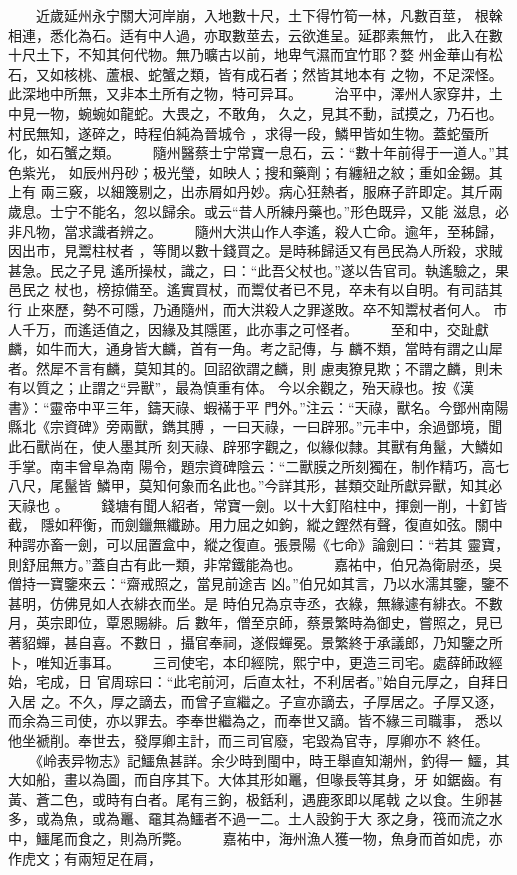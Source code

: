 \documentclass{ctexart}
\begin{document}
　　近歲延州永宁關大河岸崩，入地數十尺，土下得竹筍一林，凡數百莖， 根榦相連，悉化為石。适有中人過，亦取數莖去，云欲進呈。延郡素無竹， 此入在數十尺土下，不知其何代物。無乃曠古以前，地卑气濕而宜竹耶？婺 州金華山有松石，又如核桃、蘆根、蛇蟹之類，皆有成石者；然皆其地本有 之物，不足深怪。此深地中所無，又非本土所有之物，特可异耳。 　　治平中，澤州人家穿井，土中見一物，蜿蜿如龍蛇。大畏之，不敢角， 久之，見其不動，試摸之，乃石也。村民無知，遂碎之，時程伯純為晉城令 ，求得一段，鱗甲皆如生物。蓋蛇蜃所化，如石蟹之類。 　　隨州醫蔡士宁常寶一息石，云：``數十年前得于一道人。''其色紫光， 如辰州丹砂；极光瑩，如映人；搜和藥劑；有纏紐之紋；重如金錫。其上有 兩三竅，以細篾剔之，出赤屑如丹妙。病心狂熱者，服麻子許即定。其斤兩 歲息。士宁不能名，忽以歸余。或云``昔人所練丹藥也。''形色既异，又能 滋息，必非凡物，當求識者辨之。 　　隨州大洪山作人李遙，殺人亡命。逾年，至秭歸，因出市，見鬻柱杖者 ，等閒以數十錢買之。是時秭歸适又有邑民為人所殺，求賊甚急。民之子見 遙所操杖，識之，曰：``此吾父杖也。''遂以告官司。執遙驗之，果邑民之 杖也，榜掠備至。遙實買杖，而鬻仗者已不見，卒未有以自明。有司詰其行 止來歷，勢不可隱，乃通隨州，而大洪殺人之罪遂敗。卒不知鬻杖者何人。 市人千万，而遙适值之，因緣及其隱匿，此亦事之可怪者。 　　至和中，交趾獻麟，如牛而大，通身皆大麟，首有一角。考之記傳，与 麟不類，當時有謂之山犀者。然犀不言有麟，莫知其的。回詔欲謂之麟，則 慮夷獠見欺；不謂之麟，則未有以質之；止謂之``异獸''，最為慎重有体。 今以余觀之，殆天祿也。按《漢書》：``靈帝中平三年，鑄天祿、蝦襔于平 門外。''注云：``天祿，獸名。今鄧州南陽縣北《宗資碑》旁兩獸，鐫其膊 ，一曰天祿，一曰辟邪。''元丰中，余過鄧境，聞此石獸尚在，使人墨其所 刻天祿、辟邪字觀之，似緣似隸。其獸有角鬣，大鱗如手掌。南丰曾阜為南 陽令，題宗資碑陰云：``二獸膜之所刻獨在，制作精巧，高七八尺，尾鬣皆 鱗甲，莫知何象而名此也。''今詳其形，甚類交趾所獻异獸，知其必天祿也 。 　　錢塘有聞人紹者，常寶一劍。以十大釘陷柱中，揮劍一削，十釘皆截， 隱如秤衡，而劍鑞無纖跡。用力屈之如鉤，縱之鏗然有聲，復直如弦。關中 种諤亦畜一劍，可以屈置盒中，縱之復直。張景陽《七命》論劍曰：``若其 靈寶，則舒屈無方。''蓋自古有此一類，非常鐵能為也。 　　嘉祐中，伯兄為衛尉丞，吳僧持一寶鑒來云：``齋戒照之，當見前途吉 凶。''伯兄如其言，乃以水濡其鑒，鑒不甚明，仿佛見如人衣緋衣而坐。是 時伯兄為京寺丞，衣綠，無緣遽有緋衣。不數月，英宗即位，覃恩賜緋。后 數年，僧至京師，蔡景繁時為御史，嘗照之，見已著貂蟬，甚自喜。不數日 ，攝官奉祠，遂假蟬冕。景繁終于承議郎，乃知鑒之所卜，唯知近事耳。 　　三司使宅，本印經院，熙宁中，更造三司宅。處薛師政經始，宅成，日 官周琮曰：``此宅前河，后直太社，不利居者。''始自元厚之，自拜日入居 之。不久，厚之謫去，而曾子宣繼之。子宣亦謫去，子厚居之。子厚又逐， 而余為三司使，亦以罪去。李奉世繼為之，而奉世又謫。皆不緣三司職事， 悉以他坐褫削。奉世去，發厚卿主計，而三司官廢，宅毀為官寺，厚卿亦不 終任。 　　《岭表异物志》記鱷魚甚詳。余少時到閩中，時王舉直知潮州，釣得一 鱷，其大如船，畫以為圖，而自序其下。大体其形如鼉，但喙長等其身，牙 如鋸齒。有黃、蒼二色，或時有白者。尾有三鉤，极銛利，遇鹿豕即以尾戟 之以食。生卵甚多，或為魚，或為鼉、黿其為鱷者不過一二。土人設鉤于大 豕之身，筏而流之水中，鱷尾而食之，則為所斃。 　　嘉祐中，海州漁人獲一物，魚身而首如虎，亦作虎文；有兩短足在肩， 
\end{document}

